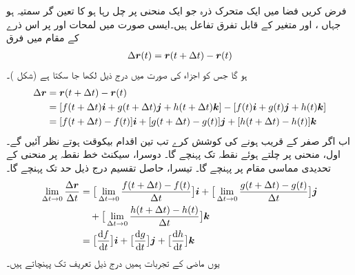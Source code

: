 فرض کریں فضا میں ایک متحرک  ذرہ جو  ایک منحنی پر چل رہا ہو کا    تعین گر سمتیہ  ہو     جہاں ،  اور  متغیر  کے قابل تفرق تفاعل ہیں۔ایسی  صورت میں لمحات   اور   پر اس ذرے کے مقام  میں فرق 
\begin{align*}
\Delta {\ensuremath{{\boldsymbol{r}}}}(t)={{\boldsymbol{r}}}(t+\Delta t)-{{\boldsymbol{r}}}(t)
\end{align*}
ہو گا جس کو اجزاء کی صورت میں درج ذیل لکھا جا سکتا ہے (شکل )۔
\begin{align*}
\Delta {\ensuremath{{\boldsymbol{r}}}}&={{\boldsymbol{r}}}(t+\Delta t)-{{\boldsymbol{r}}}(t)\\
&=[f(t+\Delta t){\boldsymbol{i}}+g(t+\Delta t){\boldsymbol{j}}+h(t+\Delta t){\boldsymbol{k}}]-[f(t){\boldsymbol{i}}+g(t){\boldsymbol{j}}+h(t){\boldsymbol{k}}]\\
&=[f(t+\Delta t)-f(t)]{\boldsymbol{i}}+[g(t+\Delta t)-g(t)]{\boldsymbol{j}}+[h(t+\Delta t)-h(t)]{\boldsymbol{k}}
\end{align*}
اب اگر  صفر کے قریب  ہونے کی کوشش کرے تب تین  اقدام بیکوقت ہوتے نظر آئیں گے۔اول،  منحنی پر چلتے ہوئے  نقطہ  تک پہنچے گا۔ دوسرا،  سیکنٹ خط   نقطہ  پر منحنی کے تحدیدی   مماسی مقام پر پہنچے گا۔ تیسرا، حاصل تقسیم  درج ذیل حد  تک پہنچے گا۔
\begin{align*}
\lim_{\Delta t\to 0}\frac{\Delta \kvec{r}}{\Delta t}&=\big[\lim_{\Delta t\to 0}\frac{f(t+\Delta t)-f(t)}{\Delta t}\big]\ai+\big[\lim_{\Delta t\to 0}\frac{g(t+\Delta t)-g(t)}{\Delta t}\big]\aj\\
&\quad +\big[\lim_{\Delta t\to 0}\frac{h(t+\Delta t)-h(t)}{\Delta t}\big]\ak\\
&=\big[\frac{\dif f}{\dif t}\big]\ai+\big[\frac{\dif g}{\dif t}\big]\aj+\big[\frac{\dif h}{\dif t}\big]\ak
\end{align*}
یوں ماضی  کے تجربات ہمیں  درج ذیل تعریف تک پہنچاتے  ہیں۔

